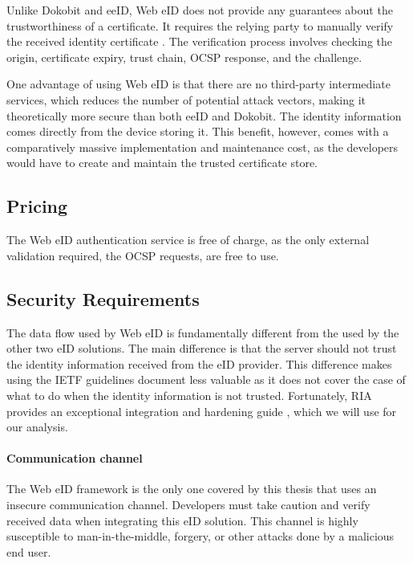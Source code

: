 Unlike Dokobit and eeID, Web eID does not provide any guarantees about the trustworthiness of a certificate. It requires the relying party to manually verify the received identity certificate \cite{ria-webeid-source-web-eid-authtoken-validation-java-readme}. The verification process involves checking the origin, certificate expiry, trust chain, OCSP response, and the challenge.

One advantage of using Web eID is that there are no third-party intermediate services, which reduces the number of potential attack vectors, making it theoretically more secure than both eeID and Dokobit. The identity information comes directly from the device storing it. This benefit, however, comes with a comparatively massive implementation and maintenance cost, as the developers would have to create and maintain the trusted certificate store.

\subsection{Pricing}

The Web eID authentication service is free of charge, as the only external validation required, the OCSP \cite{rfc6960} requests, are free to use.

\subsection{Security Requirements}

The data flow used by Web eID is fundamentally different from the used by the other two eID solutions. The main difference is that the server should not trust the identity information received from the eID provider. This difference makes using the IETF guidelines document \cite{ietf-oauth-security-topics-19} less valuable as it does not cover the case of what to do when the identity information is not trusted. Fortunately, RIA provides an exceptional integration and hardening guide \cite{ria-webeid-systemarchitecture}, which we will use for our analysis.

\paragraph{Communication channel}

The Web eID framework is the only one covered by this thesis that uses an insecure communication channel. Developers must take caution and verify received data when integrating this eID solution. This channel is highly susceptible to man-in-the-middle, forgery, or other attacks done by a malicious end user.

